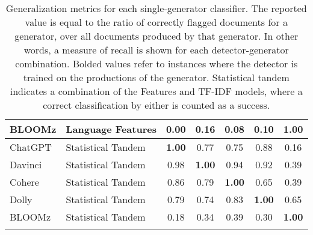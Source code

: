 \begin{table}[ht]
\begin{tabular}{llccccc}
        BLOOMz  & Language Features  & 0.00          & 0.16          & 0.08          & 0.10          & \textbf{1.00} \\
        \midrule
        ChatGPT & Statistical Tandem & \textbf{1.00} & 0.77          & 0.75          & 0.88          & 0.16          \\
        Davinci & Statistical Tandem & 0.98          & \textbf{1.00} & 0.94          & 0.92          & 0.39          \\
        Cohere  & Statistical Tandem & 0.86          & 0.79          & \textbf{1.00} & 0.65          & 0.39          \\
        Dolly   & Statistical Tandem & 0.79          & 0.74          & 0.83          & \textbf{1.00} & 0.65          \\
        BLOOMz  & Statistical Tandem & 0.18          & 0.34          & 0.39          & 0.30          & \textbf{1.00} \\
        \bottomrule
        \vspace{0.1cm}
    \end{tabular}
    \caption{
        Generalization metrics for each single-generator classifier.
        The reported value is equal to the ratio of correctly flagged documents for a generator, over all documents produced by that generator.
        In other words, a measure of recall is shown for each detector-generator combination.
        Bolded values refer to instances where the detector is trained on the productions of the generator.
        Statistical tandem indicates a combination of the Features and TF-IDF models, where a correct classification by either is counted as a success.
    }
    \label{tab:generalization}
\end{table}

